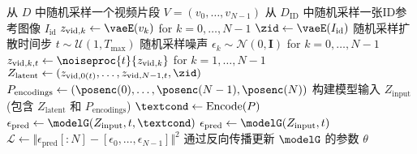 {{\begin{algorithm}
\begin{algorithmic}[1]
        \State 从 $D$ 中随机采样一个视频片段 $V = (v_0, \dots, v_{N-1})$
        \State 从 $D_{\text{ID}}$ 中随机采样一张ID参考图像 $I_{\text{id}}$
        \State {}
        \State $z_{\text{vid},k} \gets \vaeE(v_k)$ for $k=0, \dots, N-1$
        \State $\zid \gets \vaeE(I_{\text{id}})$
        \State 随机采样扩散时间步 $t \sim \mathcal{U}(1, T_{\text{max}})$
        \State 随机采样噪声 $\epsilon_k \sim \mathcal{N}(0, \mathbf{I})$ for $k=0, \dots, N-1$
        \State {}
        \State $z_{\text{vid},k,t} \gets \noiseproc{t}{z_{\text{vid},k}}$ for $k=1, \dots, N-1$
        \State {}
        \State $Z_{\text{latent}} \gets (z_{\text{vid},0(t)}, \dots, z_{\text{vid},N-1,t}, \zid)$ 
        \State {}
        \State $P_{\text{encodings}} \gets (\posenc(0), \dots, \posenc(N-1), \posenc(N))$
        \State 构建模型输入 $Z_{\text{input}}$ (包含 $Z_{\text{latent}}$ 和 $P_{\text{encodings}}$)
            \State $\textcond \gets \text{Encode}(P)$
            \State $\epsilon_{\text{pred}} \gets \modelG(Z_{\text{input}}, t, \textcond)$
        \Else
            \State $\epsilon_{\text{pred}} \gets \modelG(Z_{\text{input}}, t)$
        \EndIf
        \State {}
        \State $\mathcal{L} \gets \Vert \epsilon_{\text{pred}}[:N] - [\epsilon_0, \dots, \epsilon_{N-1}] \Vert^2$
        \State 通过反向传播更新 $\modelG$ 的参数 $\theta$
    \EndFor
    \end{algorithmic}
\end{algorithm}
}



    \removeappendixsubsecmajornumbering
}





